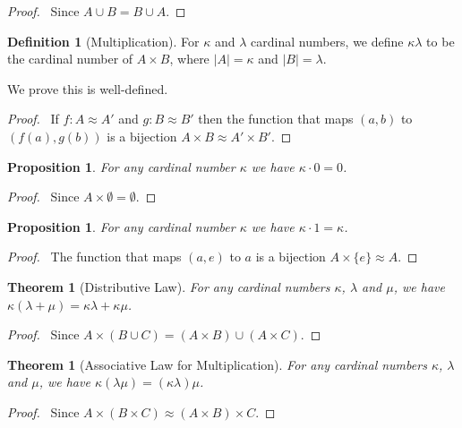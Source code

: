 \documentclass{book}
\let\qed\relax
\newtheorem{prop}[ax]{Proposition}
\newtheorem{thm}[ax]{Theorem}
\theoremstyle{definition}
\newtheorem{df}[ax]{Definition}
\begin{document}
\begin{proof}
\pf\ Since $A \cup B = B \cup A$. \qed
\end{proof}

\begin{df}[Multiplication]
For $\kappa$ and $\lambda$ cardinal numbers, we define $\kappa \lambda$ to be the cardinal number of $A \times B$, where $|A| = \kappa$ and $|B| = \lambda$.

We prove this is well-defined.
\end{df}

\begin{proof}
\pf\ If $f : A \approx A'$ and $g : B \approx B'$ then the function that maps $(a,b)$ to $(f(a),g(b))$ is a bijection $A \times B \approx A' \times B'$. \qed
\end{proof}

\begin{prop}
For any cardinal number $\kappa$ we have $\kappa \cdot 0 = 0$.
\end{prop}

\begin{proof}
\pf\ Since $A \times \emptyset = \emptyset$. \qed
\end{proof}

\begin{prop}
\label{prop:multone}
For any cardinal number $\kappa$ we have $\kappa \cdot 1 = \kappa$.
\end{prop}

\begin{proof}
\pf\ The function that maps $(a,e)$ to $a$ is a bijection $A \times \{e\} \approx A$. \qed
\end{proof}

\begin{thm}[Distributive Law]
For any cardinal numbers $\kappa$, $\lambda$ and $\mu$, we have $\kappa(\lambda + \mu) = \kappa \lambda + \kappa \mu$.
\end{thm}

\begin{proof}
\pf\ Since $A \times (B \cup C) = (A \times B) \cup (A \times C)$. \qed
\end{proof}

\begin{thm}[Associative Law for Multiplication]
For any cardinal numbers $\kappa$, $\lambda$ and $\mu$, we have $\kappa (\lambda \mu) = (\kappa \lambda) \mu$.
\end{thm}

\begin{proof}
\pf\ Since $A \times (B \times C) \approx (A \times B) \times C$. \qed
\end{proof}
\end{document}
